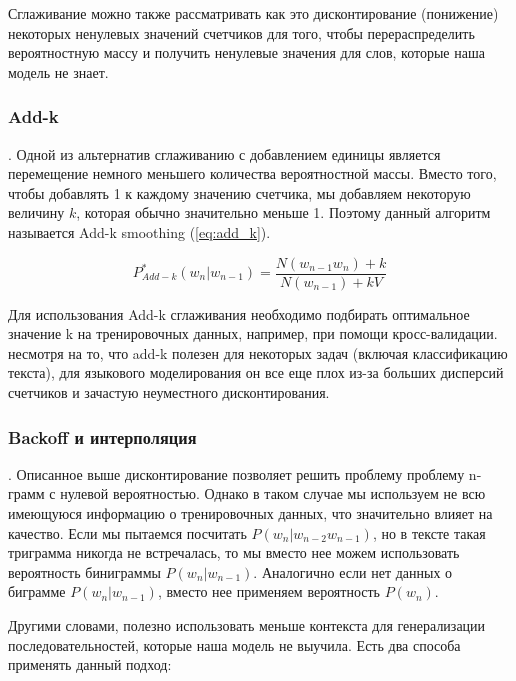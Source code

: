 Сглаживание можно также рассматривать как это дисконтирование (понижение) некоторых ненулевых значений счетчиков для того, чтобы перераспределить вероятностную массу и получить ненулевые значения для слов, которые наша модель не знает. ~\cite{n_grams}

\subsubsection{Add-k}. Одной из альтернатив сглаживанию с добавлением единицы является перемещение немного меньшего количества вероятностной массы. Вместо того, чтобы добавлять 1 к каждому значению счетчика, мы добавляем некоторую величину $k$, которая обычно значительно меньше 1. Поэтому данный алгоритм называется Add-k smoothing (\ref{eq:add_k}).

\begin{equation}
	\label{eq:add_k}
	P^*_{Add-k}(w_n|w_{n-1}) = \frac{N(w_{n-1}w_n) + k}{N(w_{n-1}) + kV}
\end{equation}

Для использования Add-k сглаживания необходимо подбирать оптимальное значение k на тренировочных данных, например, при помощи кросс-валидации. несмотря на то, что add-k полезен для некоторых задач (включая классификацию текста), для языкового моделирования он все еще плох из-за больших дисперсий счетчиков и зачастую неуместного дисконтирования.

\subsubsection{Backoff и интерполяция}. Описанное выше дисконтирование позволяет решить проблему проблему n-грамм с нулевой вероятностью. Однако в таком случае мы используем не всю имеющуюся информацию о тренировочных данных, что значительно влияет на качество. Если мы пытаемся посчитать $P(w_n|w_{n-2}w_{n-1})$, но в тексте такая триграмма никогда не встречалась, то мы вместо нее можем использовать вероятность биниграммы $P(w_n|w_{n-1})$. Аналогично если нет данных о биграмме $P(w_n|w_{n-1})$, вместо нее применяем вероятность $P(w_n)$.

Другими словами, полезно использовать меньше контекста для генерализации последовательностей, которые наша модель не выучила. Есть два способа применять данный подход:

